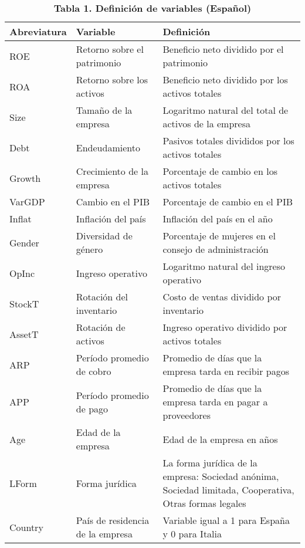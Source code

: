 \documentclass[
]{article}
\begin{document}
\begin{table}[!t]
\caption*{
{\large \textbf{Tabla 1. Definición de variables (Español)}}
} 
\fontsize{9.0pt}{10.8pt}\selectfont
\begin{tabular*}{\linewidth}{@{\extracolsep{\fill}}ll>{\raggedright\arraybackslash}p{\dimexpr 225.00pt -2\tabcolsep-1.5\arrayrulewidth}}
\toprule
\textbf{Abreviatura} & \textbf{Variable} & \textbf{Definición} \\ 
\midrule\addlinespace[2.5pt]
ROE & Retorno sobre el patrimonio & Beneficio neto dividido por el patrimonio \\ 
ROA & Retorno sobre los activos & Beneficio neto dividido por los activos totales \\ 
Size & Tamaño de la empresa & Logaritmo natural del total de activos de la empresa \\ 
Debt & Endeudamiento & Pasivos totales divididos por los activos totales \\ 
Growth & Crecimiento de la empresa & Porcentaje de cambio en los activos totales \\ 
VarGDP & Cambio en el PIB & Porcentaje de cambio en el PIB \\ 
Inflat & Inflación del país & Inflación del país en el año \\ 
Gender & Diversidad de género & Porcentaje de mujeres en el consejo de administración \\ 
OpInc & Ingreso operativo & Logaritmo natural del ingreso operativo \\ 
StockT & Rotación del inventario & Costo de ventas dividido por inventario \\ 
AssetT & Rotación de activos & Ingreso operativo dividido por activos totales \\ 
ARP & Período promedio de cobro & Promedio de días que la empresa tarda en recibir pagos \\ 
APP & Período promedio de pago & Promedio de días que la empresa tarda en pagar a proveedores \\ 
Age & Edad de la empresa & Edad de la empresa en años \\ 
LForm & Forma jurídica & La forma jurídica de la empresa: Sociedad anónima, 
    Sociedad limitada, Cooperativa, Otras formas legales \\ 
Country & País de residencia de la empresa & Variable igual a 1 para España y 0 para Italia \\ 
\bottomrule
\end{tabular*}
\end{table}
\end{document}
